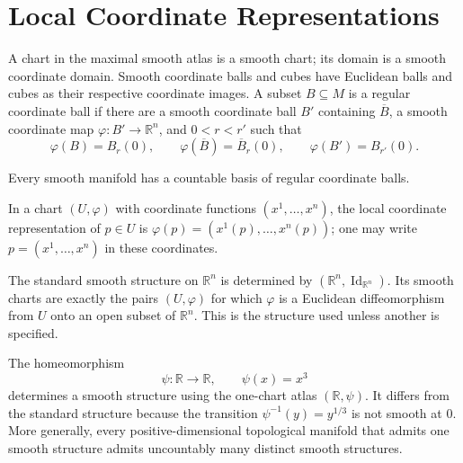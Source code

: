 \section{Local Coordinate Representations}

\begin{definition}
\label{def:1-3-extra-1}




A chart in the maximal smooth atlas is a smooth chart; its domain is a smooth
coordinate domain. Smooth coordinate balls and cubes have Euclidean balls and
cubes as their respective coordinate images. A subset $B\subseteq M$ is a
regular coordinate ball if there are a smooth coordinate ball $B'$ containing
$\overline B$, a smooth coordinate map $\varphi:B'\to\mathbb R^n$, and
$0<r<r'$ such that
\[
\varphi(B)=B_r(0),\qquad
\varphi(\overline B)=\overline B_r(0),\qquad
\varphi(B')=B_{r'}(0).
\]
\end{definition}

\begin{proposition}
\label{prop:1-19}




Every smooth manifold has a countable basis of regular coordinate balls.
\end{proposition}


\begin{notation}
\label{not:1-3-extra-2}



In a chart $(U,\varphi)$ with coordinate functions $(x^1,\ldots,x^n)$, the
local coordinate representation of $p\in U$ is
$\varphi(p)=(x^1(p),\ldots,x^n(p))$; one may write
$p=(x^1,\ldots,x^n)$ in these coordinates.
\end{notation}


\begin{example}
\label{ex:1-22}




The standard smooth structure on $\mathbb R^n$ is determined by
$(\mathbb R^n,\operatorname{Id}_{\mathbb R^n})$. Its smooth charts are exactly
the pairs $(U,\varphi)$ for which $\varphi$ is a Euclidean diffeomorphism from
$U$ onto an open subset of $\mathbb R^n$. This is the structure used unless
another is specified.
\end{example}

\begin{example}
\label{ex:1-23}



The homeomorphism
\[
\psi:\mathbb R\to\mathbb R,\qquad \psi(x)=x^3 \tag{1.1}
\]
determines a smooth structure using the one-chart atlas
$(\mathbb R,\psi)$. It differs from the standard structure because the
transition $\psi^{-1}(y)=y^{1/3}$ is not smooth at $0$.
More generally, every positive-dimensional topological manifold that admits
one smooth structure admits uncountably many distinct smooth structures.
\end{example}

